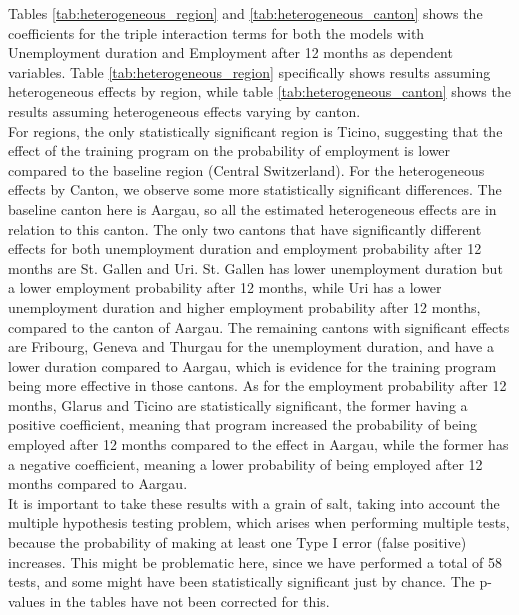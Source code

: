 \documentclass{scrartcl}
\begin{document}
Tables \ref{tab:heterogeneous_region} and \ref{tab:heterogeneous_canton} shows the coefficients for the triple interaction terms for both the models with Unemployment duration and Employment after 12 months as dependent variables. Table \ref{tab:heterogeneous_region} specifically shows results assuming heterogeneous effects by region, while table \ref{tab:heterogeneous_canton} shows the results assuming heterogeneous effects varying by canton. \\

For regions, the only statistically significant region is Ticino, suggesting that the effect of the training program on the probability of employment is lower compared to the baseline region (Central Switzerland). For the heterogeneous effects by Canton, we observe some more statistically significant differences. The baseline canton here is Aargau, so all the estimated heterogeneous effects are in relation to this canton. The only two cantons that have significantly different effects for both unemployment duration and employment probability after 12 months are St. Gallen and Uri. St. Gallen has lower unemployment duration but a lower employment probability after 12 months, while Uri has a lower unemployment duration and higher employment probability after 12 months, compared to the canton of Aargau. The remaining cantons with significant effects are Fribourg, Geneva and Thurgau for the unemployment duration, and have a lower duration compared to Aargau, which is evidence for the training program being more effective in those cantons. As for the employment probability after 12 months, Glarus and Ticino are statistically significant, the former having a positive coefficient, meaning that program increased the probability of being employed after 12 months compared to the effect in Aargau, while the former has a negative coefficient, meaning a lower probability of being employed after 12 months compared to Aargau. \\

It is important to take these results with a grain of salt, taking into account the multiple hypothesis testing problem, which arises when performing multiple tests, because the probability of making at least one Type I error (false positive) increases. This might be problematic here, since we have performed a total of 58 tests, and some might have been statistically significant just by chance. The p-values in the tables have not been corrected for this. 

\printbibliography
\end{document}
